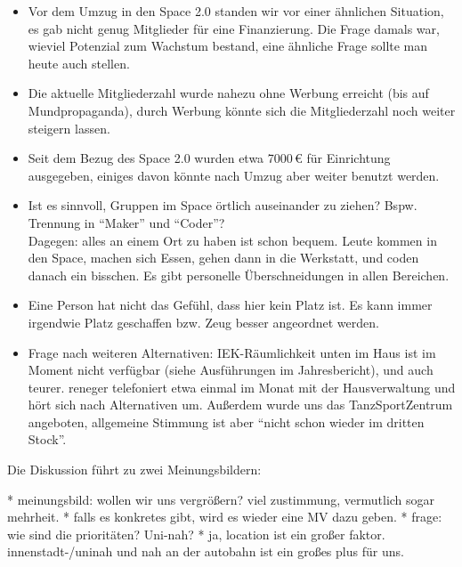 \documentclass{s0minutes}
\begin{document}
\begin{itemize}
  \item Vor dem Umzug in den Space 2.0 standen wir vor einer ähnlichen
    Situation, es gab nicht genug Mitglieder für eine Finanzierung. Die Frage
    damals war, wieviel Potenzial zum Wachstum bestand, eine ähnliche Frage
    sollte man heute auch stellen.
  \item Die aktuelle Mitgliederzahl wurde nahezu ohne Werbung erreicht
    (bis auf Mundpropaganda), durch Werbung könnte sich die Mitgliederzahl noch
    weiter steigern lassen.
  \item Seit dem Bezug des Space 2.0 wurden etwa 7000\,€ für Einrichtung
    ausgegeben, einiges davon könnte nach Umzug aber weiter benutzt werden.
  \item Ist es sinnvoll, Gruppen im Space örtlich auseinander zu ziehen? Bspw.
    Trennung in "`Maker"' und "`Coder"'? \\
    Dagegen: alles an einem Ort zu haben ist schon bequem. Leute kommen in den
    Space, machen sich Essen, gehen dann in die Werkstatt, und coden danach ein
    bisschen. Es gibt personelle Überschneidungen in allen Bereichen.
  \item Eine Person hat nicht das Gefühl, dass hier kein Platz ist. Es kann
    immer irgendwie Platz geschaffen bzw. Zeug besser angeordnet werden.
  \item Frage nach weiteren Alternativen: IEK-Räumlichkeit unten im Haus ist im
    Moment nicht verfügbar (siehe Ausführungen im Jahresbericht), und auch
    teurer. reneger telefoniert etwa einmal im Monat mit der Hausverwaltung und
    hört sich nach Alternativen um. Außerdem wurde uns das TanzSportZentrum
    angeboten, allgemeine Stimmung ist aber "`nicht schon wieder im dritten
    Stock"'.
\end{itemize}

Die Diskussion führt zu zwei Meinungsbildern:




* meinungsbild: wollen wir uns vergrößern? viel zustimmung, vermutlich sogar mehrheit.
		* falls es konkretes gibt, wird es wieder eine MV dazu geben.
		* frage: wie sind die prioritäten? Uni-nah? 
			* ja, location ist ein großer faktor. innenstadt-/uninah und nah an der autobahn ist ein großes plus für uns.
\end{document}
